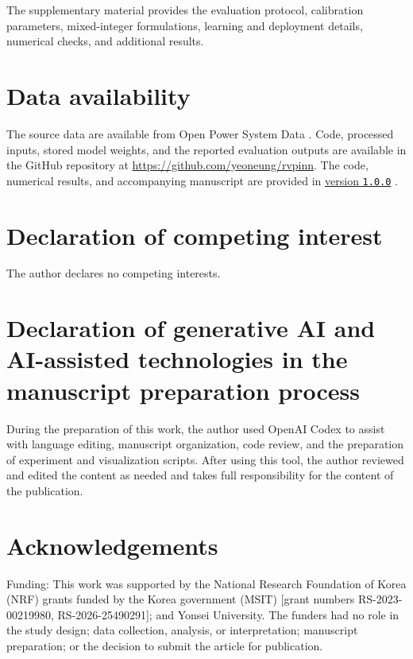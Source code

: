 \documentclass[preprint,11pt]{elsarticle}
\theoremstyle{plain}
\theoremstyle{remark}
\begin{document}
The supplementary material provides the evaluation protocol, calibration
parameters, mixed-integer formulations, learning and deployment details,
numerical checks, and additional results.

\section*{Data availability}

The source data are available from Open Power System Data \citep{OPSD2020}. Code, processed
inputs, stored model weights, and the reported evaluation outputs are
available in the GitHub repository at \url{https://github.com/yeoneung/rvpinn}.
The code, numerical results, and accompanying manuscript are provided in
\href{https://github.com/yeoneung/rvpinn/tree/v1.0.0}{version \texttt{1.0.0}} \citep{KimDispatch2026}.

\section*{Declaration of competing interest}

The author declares no competing interests.

\section*{Declaration of generative AI and AI-assisted technologies in the
manuscript preparation process}

During the preparation of this work, the author used OpenAI Codex to assist
with language editing, manuscript organization, code review, and the
preparation of experiment and visualization scripts. After using this tool,
the author reviewed and edited the content as needed and takes full
responsibility for the content of the publication.

\section*{Acknowledgements}

Funding: This work was supported by the National Research Foundation of Korea (NRF)
grants funded by the Korea government (MSIT)
[grant numbers RS-2023-00219980, RS-2026-25490291]; and Yonsei University.
The funders had no role in the study design; data collection, analysis, or
interpretation; manuscript preparation; or the decision to submit the
article for publication.



\end{document}
